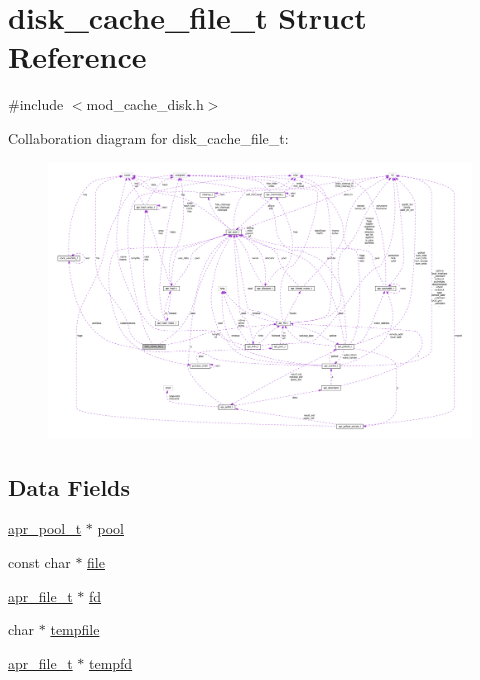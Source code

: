 \hypertarget{structdisk__cache__file__t}{}\section{disk\+\_\+cache\+\_\+file\+\_\+t Struct Reference}
\label{structdisk__cache__file__t}


{\ttfamily \#include $<$mod\+\_\+cache\+\_\+disk.\+h$>$}



Collaboration diagram for disk\+\_\+cache\+\_\+file\+\_\+t\+:
\nopagebreak
\begin{figure}[H]
\begin{center}
\leavevmode
\includegraphics[width=350pt]{structdisk__cache__file__t__coll__graph}
\end{center}
\end{figure}
\subsection*{Data Fields}
\begin{DoxyCompactItemize}
\item 
\hyperlink{structapr__pool__t}{apr\+\_\+pool\+\_\+t} $\ast$ \hyperlink{structdisk__cache__file__t_a3d9b355a822d12d5f221f15a8bd1f240}{pool}
\item 
const char $\ast$ \hyperlink{structdisk__cache__file__t_ad7bc143b1b22f666fdfd7cb8bf27616a}{file}
\item 
\hyperlink{structapr__file__t}{apr\+\_\+file\+\_\+t} $\ast$ \hyperlink{structdisk__cache__file__t_a8dddad277ebd30eaf4c8a446ccc95f36}{fd}
\item 
char $\ast$ \hyperlink{structdisk__cache__file__t_af0e439775beb63c06cf938f9e3eef29d}{tempfile}
\item 
\hyperlink{structapr__file__t}{apr\+\_\+file\+\_\+t} $\ast$ \hyperlink{structdisk__cache__file__t_a62ca989531a35354a468a46f0bbafaba}{tempfd}
\end{DoxyCompactItemize}


